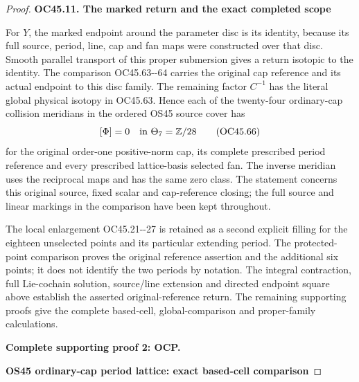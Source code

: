 \begin{proof}
\par

\medskip\noindent\textbf{OC45.11. The marked return and the exact completed scope}

\par\nobreak

For \(Y\), the marked endpoint around the parameter disc
is its identity, because its full source, period, line,
cap and fan maps were constructed over that disc. Smooth
parallel transport of this proper submersion gives a
return isotopic to the identity. The comparison
OC45.63-\/-64 carries the original cap reference and
its actual endpoint to this disc family. The remaining
factor \(C^{-1}\) has the literal global physical
isotopy in OC45.63. Hence each of the twenty-four
ordinary-cap collision meridians in the ordered OS45
source cover has
\[
 [\Phi]=0\quad\hbox{in }\Theta_7=\mathbb Z/28
 \tag{OC45.66}
\]
for the original order-one positive-norm cap, its
complete prescribed period reference and every
prescribed lattice-basis selected fan. The inverse
meridian uses the reciprocal maps and has the same
zero class. The statement concerns this original
source, fixed scalar and cap-reference closing;
the full source and linear markings in the comparison
have been kept throughout.

The local enlargement OC45.21-\/-27 is retained as a
second explicit filling for the eighteen unselected
points and its particular extending period. The
protected-point comparison proves the original
reference assertion and the additional six points;
it does not identify the two periods by notation.
The integral contraction, full Lie-cochain solution,
source/line extension and directed endpoint square above
establish the asserted original-reference return.
The remaining supporting proofs give the complete
based-cell, global-comparison and proper-family calculations.



\par\bigskip\noindent\textbf{Complete supporting proof 2: OCP.}\par


\par

\medskip\noindent\textbf{OS45 ordinary-cap period lattice: exact based-cell comparison}

\par\nobreak


\end{proof}
